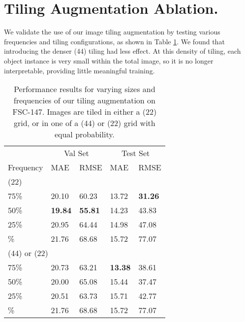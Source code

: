 \documentclass[letterpaper, 11pt]{IEEEtran}
\begin{document}
\section{Tiling Augmentation Ablation.}\label{append_tile}
We validate the use of our image tiling augmentation by testing various frequencies and tiling configurations, as shown in Table \ref{ablation_tile2}. 
We found that introducing the denser (44) tiling had less effect. 
At this density of tiling, each object instance is very small within the total image, so it is no longer interpretable, providing little meaningful training. 
\begin{table}[!h]
    \centering
    \fontsize{9}{9}\selectfont
    \begin{tabular}{lllll}
\toprule
  & \multicolumn{2}{c}{Val Set} & \multicolumn{2}{c}{Test Set} \\
 Frequency & MAE & RMSE & MAE & RMSE
 \\
 \midrule
 \multicolumn{5}{l}{(22)} \\
75\% & 20.10 & 60.23 & 13.72 & \textbf{31.26} \\
50\% & \textbf{19.84}  & \textbf{55.81} & 14.23  & 43.83 \\
25\% & 20.95 & 64.44 & 14.98 & 47.08 \\
\; 0\% & 21.76 & 68.68 & 15.72 & 77.07 \\
\multicolumn{5}{l}{(44) or (22)} \\
75\% & 20.73 & 63.21 & \textbf{13.38} & 38.61\\
50\% & 20.00 & 65.08 & 15.44 & 37.47 \\
25\% & 20.51 & 63.73 & 15.71 & 42.77\\
\; 0\% & 21.76 & 68.68 & 15.72 & 77.07\\
\bottomrule
\end{tabular}

 



     \caption{Performance results for varying sizes and frequencies of our tiling augmentation on FSC-147. Images are tiled in either a (22) grid, or in one of a (44) or (22) grid with equal probability.
    }
    \label{ablation_tile2}
\end{table} 
\end{document}
